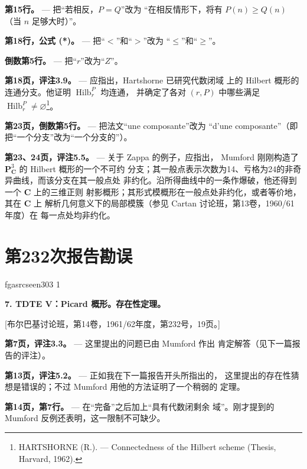 \documentclass[12pt,twoside,openany]{book}
\numberwithin{equation}{section}
\newcommand{\fgaunitid}{unbound}
\newcommand{\src}[1]{%
  \phantomsection
  \hypertarget{src:\fgaunitid:#1}{}%
  \hypertarget{fga.\fgaunitid.p#1}{}%
  \ifcsname fgasrcseen#1\endcsname\else
    \expandafter\gdef\csname fgasrcseen#1\endcsname{1}%
    \hypertarget{src:#1}{}%
  \fi
  \marginpar{\raggedleft\footnotesize\sffamily #1}%
}
\newcommand{\sid}[1]{%
  \gdef\fgaunitid{#1}%
  \phantomsection\hypertarget{fga:#1}{}\hypertarget{fga.#1}{}%
}
\theoremstyle{plain}
\theoremstyle{definition}
\theoremstyle{remark}
\begin{document}
\noindent\textbf{第15行。} --- 把“若相反，$P=Q$”改为
“在相反情形下，将有 $P(n)\geq Q(n)$（当 $n$ 足够大时）”。

\noindent\textbf{第18行，公式 (*)。} --- 把“$<$”和“$>$”改为
“$\leq$”和“$\geq$”。

\noindent\textbf{倒数第5行。} --- 把“$r$”改为“$Z$”。

\noindent\textbf{第18页，评注3.9。} --- 应指出，Hartshorne 已研究代数闭域
上的 Hilbert 概形的连通分支。他证明 $\operatorname{Hilb}^{P}_{r}$ 均连通，
并确定了各对 $(r,P)$ 中哪些满足
$\operatorname{Hilb}^{P}_{r}\neq\varnothing$\footnote{HARTSHORNE (R.). --- Connectedness of the Hilbert
scheme (Thesis, Harvard, 1962).}。

\noindent\textbf{第23页，倒数第5行。} --- 把法文“une composante”改为
“d'une composante”（即把“一个分支”改为“一个分支的”）。

\noindent\textbf{第23、24页，评注5.5。} --- 关于 Zappa 的例子，应指出，
Mumford 刚刚构造了 $\mathbf P^3_{\mathbf C}$ 的 Hilbert 概形的一个不可约
分支；其一般点表示次数为14、亏格为24的非奇异曲线，而该分支在其一般点处
非约化。沿所得曲线中的一条作爆破，他还得到一个 $\mathbf C$ 上的三维正则
射影概形；其形式模概形在一般点处非约化，或者等价地，其在 $\mathbf C$ 上
解析几何意义下的局部模簇（参见 Cartan 讨论班，第13卷，1960/61年度）在
每一点处均非约化。

\par

\clearpage
\chapter*{第232次报告勘误}
\sid{e232}
\src{303}

\noindent\textbf{7. TDTE V：Picard 概形。存在性定理。}

\begin{center}
[布尔巴基讨论班，第14卷，1961/62年度，第232号，19页。]
\end{center}

\noindent\textbf{第7页，评注3.3。} --- 这里提出的问题已由 Mumford 作出
肯定解答（见下一篇报告的评注）。

\noindent\textbf{第13页，评注5.2。} --- 正如我在下一篇报告开头所指出的，
这里提出的存在性猜想是错误的；不过 Mumford 用他的方法证明了一个稍弱的
定理。

\noindent\textbf{第14页，第7行。} --- 在“完备”之后加上“具有代数闭剩余
域”。刚才提到的 Mumford 反例还表明，这一限制不可缺少。
\end{document}
